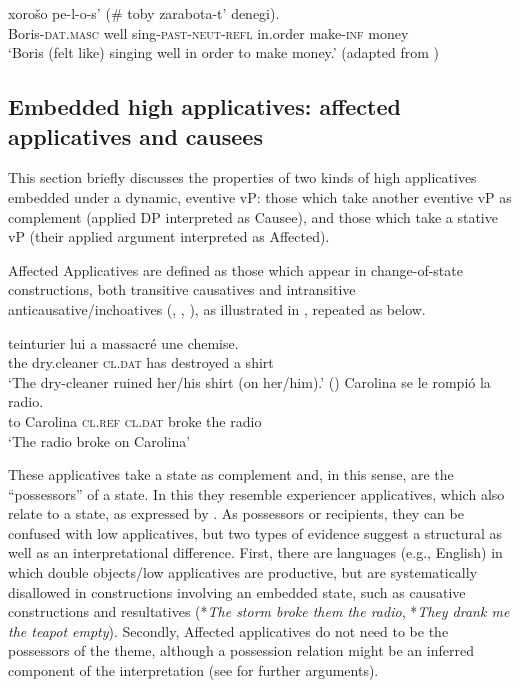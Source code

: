 \documentclass[output=paper,colorlinks,citecolor=brown,nonflat]{./langscibook}
\begin{document}
\ea%
    \label{ex:cuervo:11}
     {xorošo} {pe-l-o-s’} {(\# {toby}} {zarabota-t’} {denegi).}\\
    Boris-\textsc{dat.masc}   well sing-\textsc{past-neut-refl}  {} in.order make-\textsc{inf} money\\
    \glt ‘Boris (felt like) singing well in order to make money.’   (adapted from \citealt[189]{Skorniakova2009})
    \z

\subsection{Embedded high applicatives: affected applicatives and causees}\label{sec:cuervo:4.3}

This section briefly discusses the properties of two kinds of high applicatives embedded under a dynamic, eventive vP: those which take another eventive vP as complement (applied DP interpreted as Causee), and those which take a stative vP (their applied argument interpreted as Affected). 

Affected Applicatives are defined as those which appear in change-of-state constructions, both transitive causatives and intransitive anticausative/inchoatives (\citealt{Cuervo2003}, \citeyear{Cuervo2010Probus}, \citeyear{Cuervo2015Syntax}), as illustrated in , repeated as  below. 

\ea%
    \label{ex:cuervo:12}
    \ea%
        \label{ex:cuervo:12a}
         {teinturier} {lui} {a} {massacré} {une} {chemise.}\\
        the dry.cleaner \textsc{cl.dat} has destroyed a shirt\\
        \glt ‘The dry-cleaner ruined her/his shirt (on her/him).’  (\citealt{BonehNash2012})
    \ex%
        \label{ex:cuervo:12b}
         {Carolina}   {se}       {le}    {rompió} {la} {radio}.\\
        to Carolina  \textsc{cl.ref} \textsc{cl.dat}    broke   the radio\\
        \glt ‘The radio broke on Carolina’
    \z
\z

These applicatives take a state as complement and, in this sense, are the “possessors” of a state. In this they resemble experiencer applicatives, which also relate to a state, as expressed by .  As possessors or recipients, they can be confused with low applicatives, but two types of evidence suggest a structural as well as an interpretational difference. First, there are languages (e.g., English) in which double objects/low applicatives are productive, but are systematically disallowed in constructions involving an embedded state, such as causative constructions and resultatives (*\textit{The storm broke them the radio}, *\textit{They drank me the teapot empty}). Secondly, Affected applicatives do not need to be the possessors of the theme, although a possession relation might be an inferred component of the interpretation (see \citealt{Cuervo2003} for further arguments). 
\end{document}
